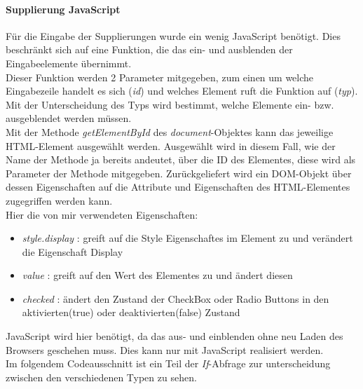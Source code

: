 \paragraph{Supplierung JavaScript\\}\label{sec:content_imple_input_java_supp}
Für die Eingabe der Supplierungen wurde ein wenig JavaScript benötigt. Dies beschränkt sich auf eine Funktion, die das ein- und ausblenden der Eingabeelemente übernimmt.\\
Dieser Funktion werden 2 Parameter mitgegeben, zum einen um welche Eingabezeile handelt es sich (\textit{id}) und welches Element ruft die Funktion auf (\textit{typ}).\\
Mit der Unterscheidung des Typs wird bestimmt, welche Elemente ein- bzw. ausgeblendet werden müssen.\\
Mit der Methode \textit{getElementById} des \textit{document}-Objektes kann das jeweilige HTML-Element ausgewählt werden. Ausgewählt wird in diesem Fall, wie der Name der Methode ja bereits andeutet, über die ID des Elementes, diese wird als Parameter der Methode mitgegeben. Zurückgeliefert wird ein DOM-Objekt über dessen Eigenschaften auf die Attribute und Eigenschaften des HTML-Elementes zugegriffen werden kann.\\
Hier die von mir verwendeten Eigenschaften:
\begin{itemize}
	\item \textit{style.display} : greift auf die Style Eigenschaftes im Element zu und verändert die Eigenschaft Display
	\item \textit{value} : greift auf den Wert des Elementes zu und ändert diesen
	\item \textit{checked} : ändert den Zustand der CheckBox oder Radio Buttons in den aktivierten(true) oder deaktivierten(false) Zustand
\end{itemize}
JavaScript wird hier benötigt, da das aus- und einblenden ohne neu Laden des Browsers geschehen muss. Dies kann nur mit JavaScript realisiert werden.\\
Im folgendem Codeausschnitt ist ein Teil der \textit{If}-Abfrage zur unterscheidung zwischen den verschiedenen Typen zu sehen.

